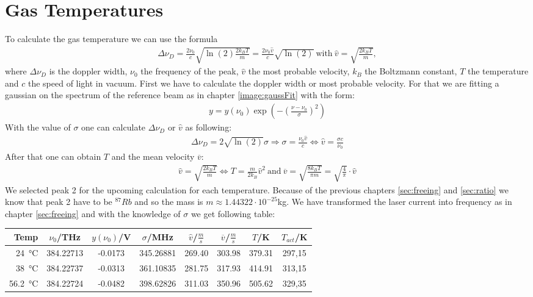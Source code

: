 \newpage
\section{Gas Temperatures}
\label{sec:temp}
To calculate the gas temperature we can use the formula
\begin{gather}
    \Delta \nu_D = \frac{2\nu_0}{c}\sqrt{\ln(2)\frac{2k_BT}{m}} = \frac{2\nu_0\hat{v}}{c}\sqrt{\ln(2)}~\text{with}~\hat{v}= \sqrt{\frac{2k_BT}{m}},
\end{gather}
where $\Delta\nu_D$ is the doppler width, $\nu_0$ the frequency of the peak, $\hat{v}$ the most probable velocity, $k_B$ the Boltzmann constant, $T$ the temperature and $c$ the speed of light in vacuum.
First we have to calculate the doppler width or most probable velocity. For that we are fitting a gaussian on the spectrum of the reference beam as in chapter \ref{image:gaussFit} with the form:
\begin{gather}
    y = y(\nu_0) \exp(-\left(\frac{\nu-\nu_0}{\sigma}\right)^2)
\end{gather}
With the value of $\sigma$ one can calculate $\Delta\nu_D$ or $\hat{v}$ as following:
\begin{gather}
    \Delta\nu_D = 2\sqrt{\ln(2)}\sigma \Rightarrow \sigma = \frac{\nu_0\hat{v}}{c} \Leftrightarrow \hat{v} = \frac{\sigma c}{\nu_0}
\end{gather}
After that one can obtain $T$ and the mean velocity $\overline{v}$:
\begin{gather}
    \hat{v} =  \sqrt{\frac{2k_BT}{m}} \Leftrightarrow T = \frac{m}{2 k_B} \hat{v}^2~\text{and}~\overline{v} = \sqrt{\frac{8k_BT}{\pi m}} = \sqrt{\frac{4}{\pi}}\cdot\hat{v}
\end{gather} 
We selected peak 2 for the upcoming calculation for each temperature. Because of the previous chapters \ref{sec:freeing} and \ref{sec:ratio} we know that peak 2 have to be $^{87}Rb$ and so the mass is $m\approx1.44322\cdot 10^{-25}$kg. We have transformed the laser current into frequency as in chapter \ref{sec:freeing} and with the knowledge of $\sigma$ we get following table:
\begin{center}
    \begin{tabular}{r | c c c| c c | c c}
        Temp & $\nu_0$/THz & $y(\nu_0)$/V & $\sigma$/MHz & $\hat{v}$/$\frac{m}{s}$ & $\overline{v}$/$\frac{m}{s}$& $T$/K & $T_{act}$/K\\
        \hline 
        \SI{24}{\celsius}   &384.22713 & -0.0173 & 345.26881 & 269.40 & 303.98 & 379.31 & 297,15\\ 
        \SI{38}{\celsius}   &384.22737 & -0.0313 & 361.10835 & 281.75 & 317.93 & 414.91 & 313,15\\ 
        \SI{56.2}{\celsius} &384.22724 & -0.0482 & 398.62826 & 311.03 & 350.96 & 505.62 & 329,35\\ 
    \end{tabular}
\end{center}
